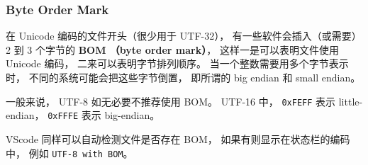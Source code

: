 \subsubsection{Byte Order Mark}
在 Unicode 编码的文件开头（很少用于 UTF-32）， 有一些软件会插入（或需要） 2 到 3 个字节的 \textbf{BOM （byte order mark）}， 这样一是可以表明文件使用 Unicode 编码， 二来可以表明字节排列顺序。 当一个整数需要用多个字节表示时， 不同的系统可能会把这些字节倒置， 即所谓的 big endian 和 small endian。

一般来说， UTF-8 如无必要不推荐使用 BOM。 UTF-16 中， \verb|0xFEFF| 表示 little-endian， \verb|0xFFFE| 表示 big-endian。

VScode 同样可以自动检测文件是否存在 BOM， 如果有则显示在状态栏的编码中， 例如 \verb|UTF-8 with BOM|。
